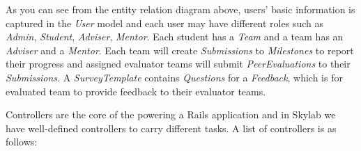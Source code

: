As you can see from the entity relation diagram above, users' basic information is captured in the \textit{User} model and each user may have different roles such as \textit{Admin}, \textit{Student}, \textit{Adviser}, \textit{Mentor}. Each student has a \textit{Team} and a team has an \textit{Adviser} and a \textit{Mentor}. Each team will create \textit{Submissions} to \textit{Milestones} to report their progress and assigned evaluator teams will submit \textit{PeerEvaluations} to their \textit{Submissions}. A \textit{SurveyTemplate} contains \textit{Questions} for a \textit{Feedback}, which is for evaluated team to provide feedback to their evaluator teams.

Controllers are the core of the powering a Rails application and in Skylab we have well-defined controllers to carry different tasks. A list of controllers is as follows:

